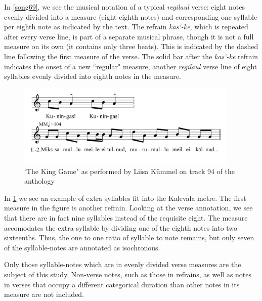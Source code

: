 In \ref{song69}, we see the musical notation of a typical {\it regilaul} verse: eight notes evenly divided into a measure (eight eighth notes) and corresponding one syllable per eighth note as indicated by the text. The refrain {\it kas`-ke}, which is repeated after every verse line, is part of a separate musical phrase, though it is not a full measure on its own (it contains only three beats). This is indicated by the dashed line following the first measure of the verse. The solid bar after the {\it kas`-ke} refrain indicates the onset of a new ``regular" measure, another {\it regilaul} verse line of eight syllables evenly divided into eighth notes in the measure. 

\begin{figure}[htb]
\begin{center}
\includegraphics[width=300pt]{figures/094.png}
\caption{`The King Game" as performed by Liisa Kümmel on track 94 of the anthology}
\label{kinggame}
\end{center}
\end{figure}

In \ref{kinggame} we see an example of extra syllables fit into the Kalevala metre. The first measure in the figure is another refrain. Looking at the verse annotation, we see that there are in fact nine syllables instead of the requisite eight. The measure accomodates the extra syllable by dividing one of the eighth notes into two sixteenths. Thus, the one to one ratio of syllable to note remains, but only seven of the syllable-notes are annotated as isochronous. 

Only those syllable-notes which are in evenly divided verse measures are the subject of this study. Non-verse notes, such as those in refrains, as well as notes in verses that occupy a different categorical duration than other notes in its measure are not included. 

%
%
%
%
% 
% 

